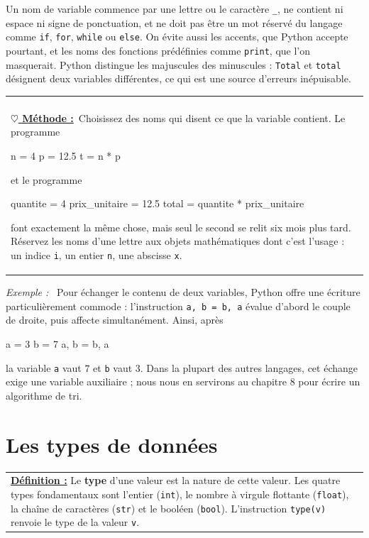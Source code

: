 \documentclass[a4paper,11pt,openany]{book}
\makeatletter
\newcommand{\mot}[1]{\textcolor{rougecours}{\textbf{#1}}}
\newcommand{\code}[1]{\texttt{\textcolor{codebleu}{#1}}}
\newenvironment{cadre}%
 {\par\vspace{2mm}\noindent\begin{tabular}{|@{\hspace{4mm}}p{0.93\textwidth}@{\hspace{4mm}}|}
  \hline \\[-2mm]}%
 {\\[2mm] \hline \end{tabular}\par\vspace{3mm}}
\newcommand{\methode}{\textbf{\underline{$\heartsuit$ Méthode :}}~}
\newenvironment{exemple}%
 {\par\vspace{1mm}\begin{list}{}{\leftmargin=1cm \rightmargin=0.5cm}\item[]%
  \textit{Exemple :}~}%
 {\end{list}\vspace{1mm}}
\makeatother
\begin{document}
Un nom de variable commence par une lettre ou le caractère \code{\_}, ne contient ni espace ni signe de ponctuation, et ne doit pas être un mot réservé du langage comme \code{if}, \code{for}, \code{while} ou \code{else}. On évite aussi les accents, que Python accepte pourtant, et les noms des fonctions prédéfinies comme \code{print}, que l'on masquerait. Python distingue les majuscules des minuscules : \code{Total} et \code{total} désignent deux variables différentes, ce qui est une source d'erreurs inépuisable.

\begin{cadre}
\methode Choisissez des noms qui disent ce que la variable contient. Le programme
\begin{python}
n = 4
p = 12.5
t = n * p
\end{python}
et le programme
\begin{python}
quantite = 4
prix_unitaire = 12.5
total = quantite * prix_unitaire
\end{python}
font exactement la même chose, mais seul le second se relit six mois plus tard. Réservez les noms d'une lettre aux objets mathématiques dont c'est l'usage : un indice \code{i}, un entier \code{n}, une abscisse \code{x}.
\end{cadre}

\begin{exemple}
Pour échanger le contenu de deux variables, Python offre une écriture particulièrement commode : l'instruction \code{a, b = b, a} évalue d'abord le couple de droite, puis affecte simultanément. Ainsi, après
\begin{python}
a = 3
b = 7
a, b = b, a
\end{python}
la variable \code{a} vaut $7$ et \code{b} vaut $3$. Dans la plupart des autres langages, cet échange exige une variable auxiliaire ; nous nous en servirons au chapitre 8 pour écrire un algorithme de tri.
\end{exemple}

\section{Les types de données}

\begin{center}
\begin{tabularx}{15cm}{||X}
\noindent \textbf{\underline{Définition :}} Le \mot{type} d'une valeur est la nature de cette valeur. Les quatre types fondamentaux sont l'entier (\code{int}), le nombre à virgule flottante (\code{float}), la chaîne de caractères (\code{str}) et le booléen (\code{bool}). L'instruction \code{type(v)} renvoie le type de la valeur \code{v}.
\end{tabularx}
\end{center}
\end{document}
